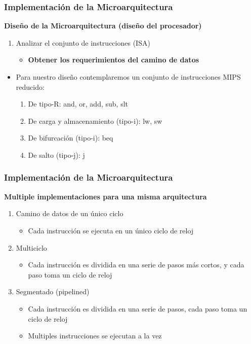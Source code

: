 \documentclass[aspectratio=169,compress]{beamer}
\begin{document}
\begin{footnotesize}
\begin{frame}
\frametitle{Implementación de la Microarquitectura}
\begin{center}\textbf{Diseño de la Microarquitectura (diseño del procesador)}\end{center}
\begin{enumerate}
\item Analizar el conjunto de instrucciones (ISA)
\begin{itemize}
\item \textbf{Obtener los requerimientos del camino de datos}
\end{itemize}
\end{enumerate}
\begin{itemize}
\item Para nuestro diseño contemplaremos un conjunto de instrucciones MIPS reducido:
\begin{enumerate}
\item De tipo-R: and, or, add, sub, slt
\item De carga y almacenamiento (tipo-i): lw, sw
\item De bifurcación (tipo-i): beq
\item De salto (tipo-j): j
\end{enumerate}
\end{itemize}

\end{frame}


\begin{frame}
\frametitle{Implementación de la Microarquitectura}
\begin{center}\textbf{Multiple implementaciones para una misma arquitectura}\end{center}

\begin{enumerate}
\item Camino de datos de un único ciclo
\begin{itemize}
\item Cada instrucción se ejecuta en un único ciclo de reloj
\end{itemize}
\item Multiciclo
\begin{itemize}
\item Cada instrucción es dividida en una serie de pasos más cortos, y cada paso toma un ciclo de reloj
\end{itemize}
\item Segmentado (pipelined)
\begin{itemize}
\item Cada instrucción es dividida en una serie de pasos, cada paso toma un ciclo de reloj
\item Multiples instrucciones se ejecutan a la vez
\end{itemize}
\end{enumerate}
\end{frame}



\end{footnotesize}
\end{document}
